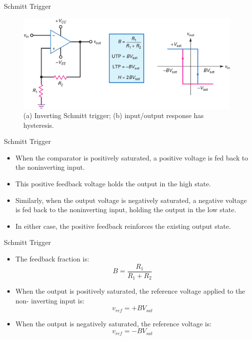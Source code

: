 \documentclass[pdflatex,compress]{beamer}
\begin{document}
\begin{frame}{Schmitt Trigger}
	\begin{figure}
		\centering
		\includegraphics[width=\linewidth]{img/2018}
		\caption{(a) Inverting Schmitt trigger; (b) input/output response has hysteresis.}
		\label{fig:2018}
	\end{figure}
\end{frame}

\begin{frame}{Schmitt Trigger}
	\begin{itemize}
		\item When the comparator is positively saturated, a positive voltage is fed back to the noninverting input.
		\item This positive feedback voltage holds the output in the high state.
		\item Similarly, when the output voltage is negatively saturated, a negative voltage is fed back to the noninverting input, holding the output in the low state.
		\item In either case, the positive feedback reinforces the existing output state.
	\end{itemize}
\end{frame}

\begin{frame}{Schmitt Trigger}
	\begin{itemize}
		\item The feedback fraction is:
		\begin{equation}\label{eq:204}
			B = \frac{R_1}{R_1 + R_2}
		\end{equation}
		\item When the output is positively saturated, the reference voltage applied to the non-		inverting input is:
		\begin{equation}\label{eq:205}
			v_{ref} = +BV_{sat}
		\end{equation}
		\item When the output is negatively saturated, the reference voltage is:
		\begin{equation}\label{eq:205}
			v_{ref} = -BV_{sat}
		\end{equation}
	\end{itemize}
\end{frame}
\end{document}
